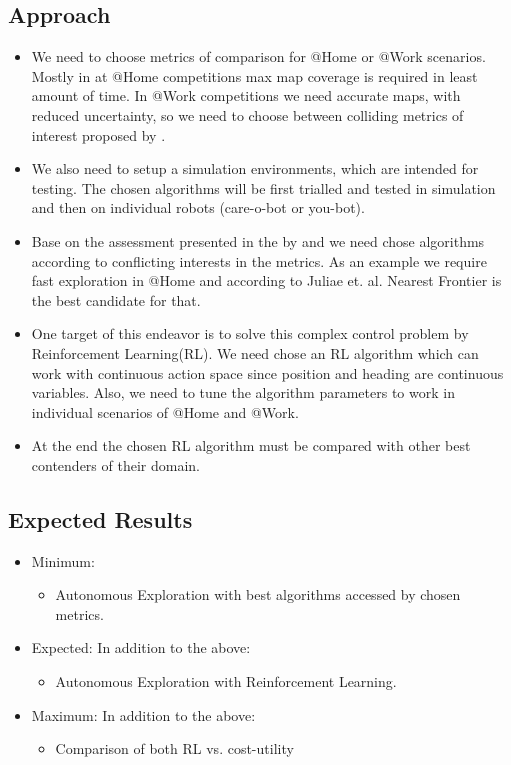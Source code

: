 \subsection{Approach}
\begin{itemize}

\item We need to choose metrics of comparison for @Home or @Work scenarios. Mostly in at @Home
competitions max map coverage is required in least amount of time. In @Work competitions we need
accurate maps, with reduced uncertainty, so we need to choose between colliding metrics of interest
proposed by \cite{Yan2015}.

\item We also need to setup a simulation environments, which are intended for testing. The chosen
algorithms will be first trialled and tested in simulation and then on individual robots (care-o-bot
or you-bot).

\item Base on the assessment presented in the by \cite{Juliae2012} and \cite{Yan2015}
we need chose algorithms according to conflicting interests in the metrics. As an example we require
fast exploration in @Home and according to Juliae et. al. Nearest Frontier is the best candidate for
that.

 \item One target of this endeavor is to solve this complex control problem by Reinforcement
Learning(RL). We need chose an RL algorithm which can work with continuous action space since
position and heading are continuous variables. Also, we need to tune the algorithm parameters to
work in individual scenarios of @Home and @Work.

\item At the end the chosen RL algorithm must be compared with other best contenders of their domain.
\end{itemize}


\subsection{Expected Results}
\begin{itemize}
	\item Minimum:
	\begin{itemize}
		\item Autonomous Exploration with best algorithms accessed by chosen metrics.
	\end{itemize}
	\item Expected:
	In addition to the above:
	\begin{itemize}
		\item Autonomous Exploration with Reinforcement Learning.
	\end{itemize}
	\item Maximum:
	In addition to the above:
	\begin{itemize}
		\item Comparison of both RL vs. cost-utility
	\end{itemize}
\end{itemize}
